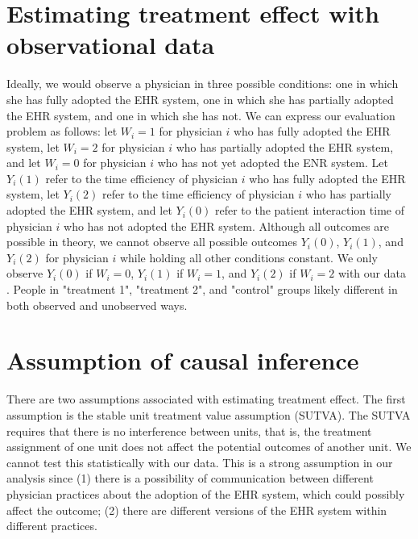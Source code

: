 \documentclass[12pt]{report}
\begin{document}
\section{Estimating treatment effect with observational data}
Ideally, we would observe a physician in three possible conditions: one in which she has fully adopted the EHR system, one in which she has partially adopted the EHR system, and one in which she has not. We can express our evaluation problem as follows: let $W_i = 1$ for physician $i$ who has fully adopted the EHR system, let $W_i = 2$ for physician $i$ who has partially adopted the EHR system, and let $W_i = 0$ for physician $i$ who has not yet adopted the ENR system. Let $Y_i(1)$ refer to the time efficiency of physician $i$ who has fully adopted the EHR system, let $Y_i(2)$ refer to the time efficiency of physician $i$ who has partially adopted the EHR system, and let $Y_i(0)$ refer to the patient interaction time of physician $i$ who has not adopted the EHR system. Although all outcomes are possible in theory, we cannot observe all possible outcomes $Y_i(0)$, $Y_i(1)$, and $Y_i(2)$ for physician $i$ while holding all other conditions constant. We only observe $Y_i(0)$ if $W_i = 0$, $Y_i(1)$ if $W_i = 1$, and $Y_i(2)$ if $W_i = 2$ with our data \citep{imbens2008recent}. People in "treatment 1", "treatment 2", and "control" groups likely different in both observed and unobserved ways.

\section{Assumption of causal inference}
There are two assumptions associated with estimating treatment effect. The first assumption is the stable unit treatment value assumption (SUTVA). The SUTVA requires that there is no interference between units, that is, the treatment assignment of one unit does not affect the potential outcomes of another unit. We cannot test this statistically with our data. This is a strong assumption in our analysis since (1) there is a possibility of communication between different physician practices about the adoption of the EHR system, which could possibly affect the outcome; (2) there are different versions of the EHR system within different practices.
\end{document}
